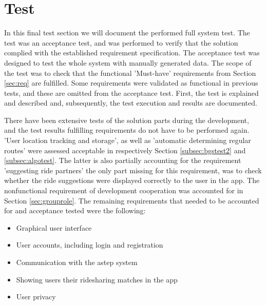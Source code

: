 \section{Test}\label{sec:s4test}
In this final test section we will document the performed full system test.
The test was an acceptance test, and was performed to verify that the solution complied with the established requirement specification.
The acceptance test was designed to test the whole system with manually generated data.
The scope of the test was to check that the functional 'Must-have' requirements from Section \ref{sec:req} are fulfilled.
Some requirements were validated as functional in previous tests, and these are omitted from the acceptance test. 
First, the test is explained and described and, subsequently, the test execution and results are documented.


There have been extensive tests of the solution parts during the development, and the test results fulfilling requirements do not have to be performed again.
'User location tracking and storage', as well as 'automatic determining regular routes' were assessed acceptable in respectively Section \ref{subsec:bgstest2} and \ref{subsec:algotest}.
The latter is also partially accounting for the requirement 'suggesting ride partners' the only part missing for this requirement, was to check whether the ride suggestions were displayed correctly to the user in the app. 
The nonfunctional requirement of development cooperation was accounted for in Section \ref{sec:grouprole}. 
The remaining requirements that needed to be accounted for and acceptance tested were the following:
\begin{itemize}
	\item Graphical user interface
	\item User accounts, including login and registration
	\item Communication with the \gls{astep} system
	\item Showing users their ridesharing matches in the app
	\item User privacy
\end{itemize}

